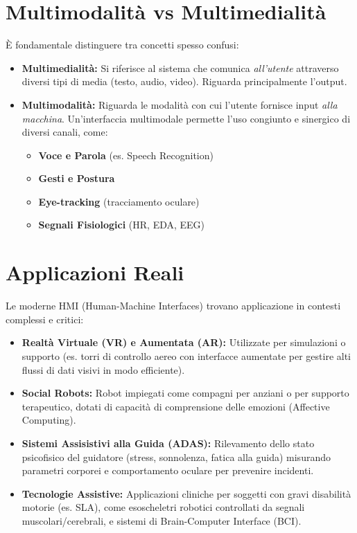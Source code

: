 \section{Multimodalità vs Multimedialità}
È fondamentale distinguere tra concetti spesso confusi:
\begin{itemize}
    \item \textbf{Multimedialità:} Si riferisce al sistema che comunica \emph{all'utente} attraverso diversi tipi di media (testo, audio, video). Riguarda principalmente l'output.
    \item \textbf{Multimodalità:} Riguarda le modalità con cui l'utente fornisce input \emph{alla macchina}. Un'interfaccia multimodale permette l'uso congiunto e sinergico di diversi canali, come:
    \begin{itemize}
        \item \textbf{Voce e Parola} (es. Speech Recognition)
        \item \textbf{Gesti e Postura}
        \item \textbf{Eye-tracking} (tracciamento oculare)
        \item \textbf{Segnali Fisiologici} (HR, EDA, EEG)
    \end{itemize}
\end{itemize}

\section{Applicazioni Reali}
Le moderne HMI (Human-Machine Interfaces) trovano applicazione in contesti complessi e critici:
\begin{itemize}
    \item \textbf{Realtà Virtuale (VR) e Aumentata (AR):} Utilizzate per simulazioni o supporto (es. torri di controllo aereo con interfacce aumentate per gestire alti flussi di dati visivi in modo efficiente).
    \item \textbf{Social Robots:} Robot impiegati come compagni per anziani o per supporto terapeutico, dotati di capacità di comprensione delle emozioni (Affective Computing).
    \item \textbf{Sistemi Assisistivi alla Guida (ADAS):} Rilevamento dello stato psicofisico del guidatore (stress, sonnolenza, fatica alla guida) misurando parametri corporei e comportamento oculare per prevenire incidenti.
    \item \textbf{Tecnologie Assistive:} Applicazioni cliniche per soggetti con gravi disabilità motorie (es. SLA), come esoscheletri robotici controllati da segnali muscolari/cerebrali, e sistemi di Brain-Computer Interface (BCI).
\end{itemize}
